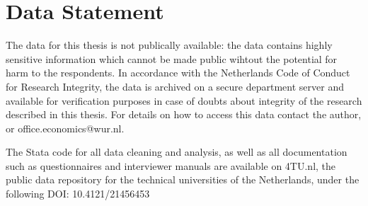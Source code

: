 \chapter*{Data Statement}
\label{chap:datastatement}

The data for this thesis is not publically available: the data contains highly sensitive information which cannot be made public wihtout the potential for harm to the respondents. In accordance with the Netherlands Code of Conduct for Research Integrity, the data is archived on a secure department server and available for verification purposes in case of doubts about integrity of the research described in this thesis. For details on how to access this data contact the author, or office.economics@wur.nl.

The Stata code for all data cleaning and analysis, as well as all documentation such as questionnaires and interviewer manuals are available on 4TU.nl, the public data repository for the technical universities of the Netherlands, under the following DOI: 10.4121/21456453